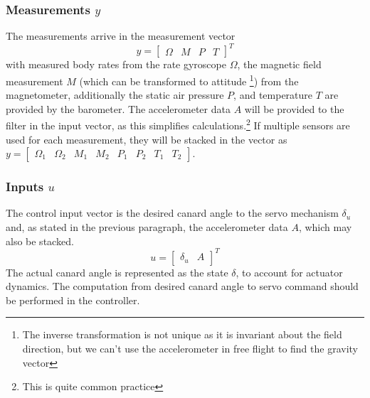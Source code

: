 \subsubsection{Measurements $y$}
The measurements arrive in the measurement vector 
\begin{equation}
    y =  \begin{bmatrix}
    \Omega & M & P & T
    \end{bmatrix}^T
\end{equation}
with measured body rates from the rate gyroscope $\Omega$, the magnetic field measurement $M$ (which can be transformed to attitude \footnote{The inverse transformation is not unique as it is invariant about the field direction, but we can’t use the accelerometer in free flight to find the gravity vector}) from the magnetometer, additionally the static air pressure $P$, and temperature $T$ are provided by the barometer.
The accelerometer data $A$ will be provided to the filter in the input vector, as this simplifies calculations.\footnote{This is quite common practice}
If multiple sensors are used for each measurement, they will be stacked in the vector as $y = [\begin{smallmatrix} \Omega_1 & \Omega_2 & M_1 & M_2 & P_1 & P_2 & T_1 & T_2 \end{smallmatrix}]$.


\subsubsection{Inputs $u$}
The control input vector is the desired canard angle to the servo mechanism $\delta_u$ and, as stated in the previous paragraph, the  accelerometer data $A$, which may also be stacked.
\begin{equation}
    u =  \begin{bmatrix}
    \delta_u & A
    \end{bmatrix}^T
    \label{eq:model-input-vector}
\end{equation}
The actual canard angle is represented as the state $\delta$, to account for actuator dynamics.
The computation from desired canard angle to servo command should be performed in the controller. 

